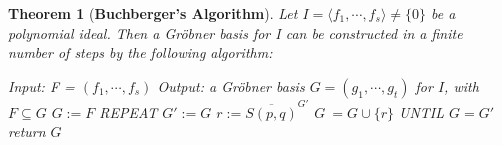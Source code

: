 \documentclass{article}
\newtheorem{theorem}{Theorem}[section]
\theoremstyle{definition}
\theoremstyle{remark}
\theoremstyle{example}
\begin{document}
\begin{theorem}[\textbf{Buchberger's Algorithm}]
    Let $I = \langle f_1,\cdots,f_s \rangle \neq \{0\}$ be a polynomial ideal. Then a Gröbner basis for I can be constructed in a finite number of steps by the following algorithm:
    \begin{algorithm}[H]
        \caption{Buchberger's Algorithm}\label{alg:bc}
        \begin{algorithmic}
        \State Input: F = $(f_{1},\cdots,f_{s})$
        \State Output: a Gröbner basis $G=(g_{1},\cdots,g_{t})$ for $I$, with $F \subseteq G$
        \newline
        \State $G:=F$
        \State REPEAT
            \State $G':=G$
                \State $r := {\overline{S(p,q)}}^{G'}$
                    \State $G\:=G\cup\{r\}$
                \EndIf
            \EndFor
        \State UNTIL $G=G'$
        \State return $G$
    \end{algorithmic}
    \end{algorithm}
\end{theorem}
\end{document}
